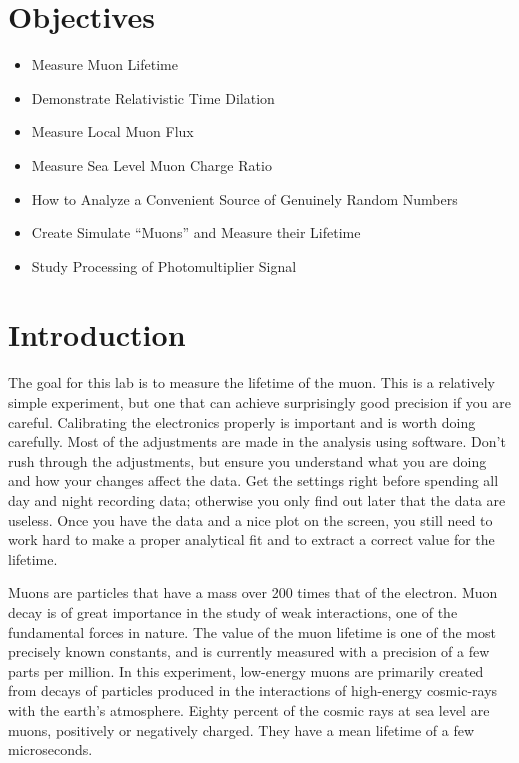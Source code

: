 \documentclass{../lab}
\begin{document}
\section{Objectives}

\begin{itemize}
    \item Measure Muon Lifetime

    \item Demonstrate Relativistic Time Dilation

    \item Measure Local Muon Flux

    \item Measure Sea Level Muon Charge Ratio

    \item How to Analyze a Convenient Source of Genuinely Random Numbers

    \item Create Simulate ``Muons'' and Measure their Lifetime

    \item Study Processing of Photomultiplier Signal

\end{itemize}

\section{Introduction}

The goal for this lab is to measure the lifetime of the muon. This is a relatively simple experiment, but one that can achieve surprisingly good precision if you are careful. Calibrating the electronics properly is important and is worth doing carefully. Most of the adjustments are made in the analysis using software. Don't rush through the adjustments, but ensure you understand what you are doing and how your changes affect the data. Get the settings right before spending all day and night recording data; otherwise you only find out later that the data are useless. Once you have the data and a nice plot on the screen, you still need to work hard to make a proper analytical fit and to extract a correct value for the lifetime.

Muons are particles that have a mass over 200 times that of the electron. Muon decay is of great importance in the study of weak interactions, one of the fundamental forces in nature. The value of the muon lifetime is one of the most precisely known constants, and is currently measured with a precision of a few parts per million. In this experiment, low-energy muons are primarily created from decays of particles produced in the interactions of high-energy cosmic-rays with the earth's atmosphere. Eighty percent of the cosmic rays at sea level are muons, positively or negatively charged. They have a mean lifetime of a few microseconds.
\end{document}

